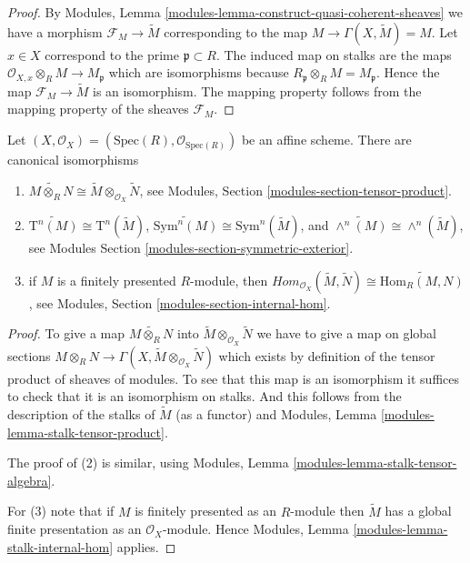 \begin{proof}
By Modules, Lemma \ref{modules-lemma-construct-quasi-coherent-sheaves}
we have a morphism $\mathcal{F}_M \to \widetilde M$ corresponding
to the map $M \to \Gamma(X, \widetilde M) = M$. Let $x \in X$
correspond to the prime $\mathfrak p \subset R$.
The induced map on stalks are the maps
$\mathcal{O}_{X, x} \otimes_R M \to M_{\mathfrak p}$
which are isomorphisms because
$R_{\mathfrak p} \otimes_R M = M_{\mathfrak p}$.
Hence the map $\mathcal{F}_M \to \widetilde M$ is an isomorphism.
The mapping property follows from the mapping property of
the sheaves $\mathcal{F}_M$.
\end{proof}

\begin{lemma}
\label{lemma-widetilde-constructions}
Let $(X, \mathcal{O}_X) = (\text{Spec}(R), \mathcal{O}_{\text{Spec}(R)})$
be an affine scheme. There are canonical isomorphisms
\begin{enumerate}
\item
$
\widetilde{M \otimes_R N}
\cong
\widetilde M \otimes_{\mathcal{O}_X} \widetilde N
$,
see Modules, Section \ref{modules-section-tensor-product}.
\item
$
\widetilde{\text{T}^n(M)}
\cong
\text{T}^n(\widetilde M)
$,
$
\widetilde{\text{Sym}^n(M)}
\cong
\text{Sym}^n(\widetilde M)
$, and
$
\widetilde{\wedge^n(M)}
\cong
\wedge^n(\widetilde M)
$,
see Modules Section \ref{modules-section-symmetric-exterior}.
\item if $M$ is a finitely presented $R$-module, then
$
\textit{Hom}_{\mathcal{O}_X}(\widetilde M, \widetilde N)
\cong
\widetilde{\text{Hom}_R(M,  N)}
$,
see Modules, Section \ref{modules-section-internal-hom}.
\end{enumerate}
\end{lemma}

\begin{proof}
To give a map $\widetilde{M \otimes_R N}$ into
$\widetilde M \otimes_{\mathcal{O}_X} \widetilde N$
we have to give a map on global sections
$M \otimes_R N \to
\Gamma(X, \widetilde M \otimes_{\mathcal{O}_X} \widetilde N)$
which exists by definition of the tensor product of sheaves
of modules. To see that this map is an isomorphism it
suffices to check that it is an isomorphism on stalks.
And this follows from the description of the stalks
of $\widetilde{M}$ (as a functor) and
Modules, Lemma \ref{modules-lemma-stalk-tensor-product}.

\medskip\noindent
The proof of (2) is similar, using
Modules, Lemma \ref{modules-lemma-stalk-tensor-algebra}.

\medskip\noindent
For (3) note that if $M$ is finitely presented as an $R$-module
then $\widetilde M$ has a global finite presentation as an
$\mathcal{O}_X$-module. Hence
Modules, Lemma \ref{modules-lemma-stalk-internal-hom} applies.
\end{proof}

